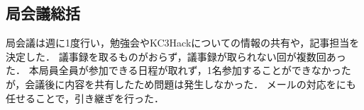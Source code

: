 \subsection*{局会議総括}


局会議は週に1度行い，勉強会やKC3Hackについての情報の共有や，記事担当を決定した．
議事録を取るものがおらず，議事録が取られない回が複数回あった．
本局員全員が参加できる日程が取れず，1名参加することができなかったが，会議後に内容を共有したため問題は発生しなかった．
メールの対応を\firstGrade{}にも任せることで，引き継ぎを行った．
